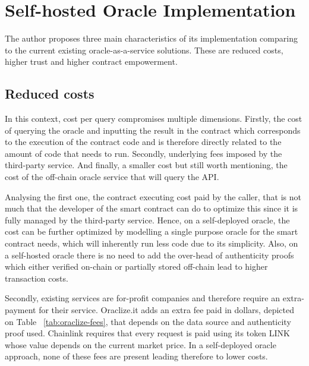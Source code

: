 \section{Self-hosted Oracle Implementation}

The author proposes three main characteristics of its implementation comparing to the current existing oracle-as-a-service solutions. These are reduced costs, higher trust and higher contract empowerment.



\subsection{Reduced costs}

In this context, cost per query compromises multiple dimensions. Firstly, the cost of querying the oracle and inputting the result in the contract which corresponds to the execution of the contract code and is therefore directly related to the amount of code that needs to run. Secondly, underlying fees imposed by the third-party service. And finally, a smaller cost but still worth mentioning, the cost of the off-chain oracle service that will query the API.

Analysing the first one, the contract executing cost paid by the caller, that is not much that the developer of the smart contract can do to optimize this since it is fully managed by the third-party service. Hence, on a self-deployed oracle, the cost can be further optimized by modelling a single purpose oracle for the smart contract needs, which will inherently run less code due to its simplicity. Also, on a self-hosted oracle there is no need to add the over-head of authenticity proofs which either verified on-chain or partially stored off-chain lead to higher transaction costs.

Secondly, existing services are for-profit companies and therefore require an extra-payment for their service. Oraclize.it adds an extra fee paid in dollars, depicted on Table ~\ref{tab:oraclize-fees}, that depends on the data source and authenticity proof used. Chainlink requires that every request is paid using its token LINK whose value depends on the current market price. In a self-deployed oracle approach, none of these fees are present leading therefore to lower costs.

